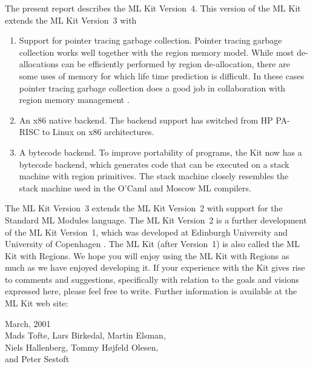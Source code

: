 \documentclass[12pt]{book}
\begin{document}
The present report describes the 
%
ML Kit Version~4. This version of the ML Kit extends the 
ML Kit Version~3 with
\begin{enumerate}
\item Support for pointer tracing garbage collection. Pointer tracing
  garbage collection works well together with the region memory model.
  While most de-allocations can be efficiently performed by region
  de-allocation, there are some uses of memory for which life time
  prediction is difficult. In these cases pointer tracing garbage
  collection does a good job in collaboration with region memory
  management \cite{hallenberg99}.
\item An x86 native backend. The 
  backend support has switched from HP PA-RISC to Linux on x86
  architectures.
  
\item A 
  bytecode backend. To improve portability of programs, the Kit now
  has a bytecode backend, which generates code that can be executed on
  a stack machine with region primitives. The stack machine closely
  resembles the stack machine used in the O'Caml and Moscow ML
  compilers.
\end{enumerate}

The 
%
ML Kit Version~3 extends the ML Kit Version~2 with support for the
Standard ML Modules language. The
%
ML Kit Version~2 is a further development of the 
%
ML Kit Version~1, which was developed at Edinburgh University and
University of Copenhagen \cite{brtt93}.  The ML Kit (after Version~1)
is also called the ML Kit with Regions.  We hope you will enjoy using
the ML Kit with Regions as much as we have enjoyed developing it. If
your experience with the Kit gives rise to comments and suggestions,
specifically with relation to the goals and visions expressed here,
please feel free to write.  Further information is available at the ML
Kit
%
web site:
\begin{tabbing}
\hskip2cm
\end{tabbing}

\begin{flushright}
March, 2001\\[1cm]
Mads Tofte, Lars Birkedal, Martin Elsman,\\
Niels Hallenberg, Tommy H\o jfeld Olesen,\\
and Peter Sestoft
\end{flushright}
\end{document}
